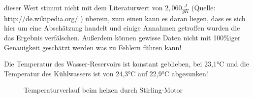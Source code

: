 dieser Wert stimmt nicht mit dem Literaturwert von $2,060 \frac{J}{gK}$ 
(Quelle: http://de.wikipedia.org/ \cite{wiki:eigenschaftenWasser}) überein, zum einen kann es daran
liegen, dass es sich hier um eine Abschätzung handelt und einige Annahmen
getroffen wurden die das Ergebnis verfälschen. Außerdem können gewisse
Daten nicht mit 100\%iger Genauigkeit geschätzt werden was zu Fehlern
führen kann!

Die Temperatur des Wasser-Reservoirs ist konstant geblieben, bei 23,1°C
und die Temperatur des Kühlwassers ist von 24,3°C auf 22,9°C abgesunken!

\begin{figure}[h!]
	\centering
	
	\caption{Temperaturverlauf beim heizen durch Stirling-Motor}
	\label{fig:a3T}
\end{figure}

